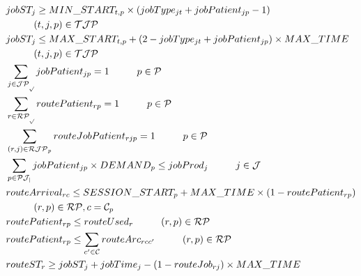 \begin{align}
		& jobST_{j} \ge MIN\_START_{t,p} \times (jobType_{jt} + jobPatient_{jp} -1) \notag\\ 
				&	\hspace{10mm} (t, j, p) \in \mathcal{TJP} \\
		& jobST_{j} \le MAX\_START_{t,p} + (2 - jobType_{jt} + jobPatient_{jp}) \times MAX\_TIME \notag\\ 
				& \hspace{10mm} (t, j, p) \in \mathcal{TJP} \\
		& \sum_{j \in \mathcal{JP_p}} jobPatient_{jp} = 1
				\hspace{10mm} p \in \mathcal{P} \\
		& \sum_{r \in \mathcal{RP_p}} routePatient_{rp} = 1
				\hspace{10mm} p \in \mathcal{P} \\
		& \sum_{(r, j) \in \mathcal{RJP}_p} routeJobPatient_{rjp} = 1
				\hspace{10mm} p \in \mathcal{P} \\
		& \sum_{p \in \mathcal{PJ_j}} jobPatient_{jp} \times DEMAND_{p} \le jobProd_{j}
				\hspace{10mm} j \in \mathcal{J} \\
		& routeArrival_{rc} \le SESSION\_START_{p} + MAX\_TIME \times (1 - routePatient_{rp}) \notag\\ 
				&	\hspace{10mm} (r, p) \in \mathcal{RP}, c = \mathcal{C}_p\\
		& routePatient_{rp} \le routeUsed_{r}
				\hspace{10mm} (r, p) \in \mathcal{RP} \\
		& routePatient_{rp} \le \sum_{c' \in \mathcal{C}} routeArc_{rcc'}
				\hspace{10mm} (r, p) \in \mathcal{RP} \\
		& routeST_{r} \ge jobST_{j} + jobTime_{j} - (1 - routeJob_{rj}) \times MAX\_TIME \notag\\ 

\end{align}

